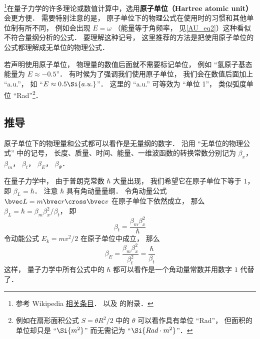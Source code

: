 

\footnote{参考 Wikipedia \href{https://en.wikipedia.org/wiki/Hartree_atomic_units}{相关条目}． 以及 \cite{Brandsen} 的附录．}在量子力学的许多理论或数值计算中，选用\textbf{原子单位（Hartree atomic unit）}会更方便． 需要特别注意的是， 原子单位下的物理公式在使用时的习惯和其他单位制有所不同， 例如会出现 $E = \omega$ （能量等于角频率， 见\autoref{AU_eq2}）这种看似不符合量纲分析的公式． 要理解这种记号， 这里推荐的方法是把使用原子单位的公式都理解成无单位的物理公式．

若声明使用原子单位， 物理量的数值后面就不需要标记单位， 例如 “氢原子基态能量为 $E \approx -0.5$”． 有时候为了强调我们使用原子单位， 我们会在数值后面加上 “a.u.”， 如 “$E \approx 0.5 \Si{a.u.}$”． 这里的 “a.u.” 可等效为 “单位 1”， 类似弧度单位 “Rad”\footnote{例如在扇形面积公式 $S = \theta R^2/2$ 中的 $\theta$ 可以看作具有单位 “Rad”， 但面积的单位却只是 “$\Si{m^2}$” 而无需记为 “$\Si{Rad\cdot m^2}$”．}．

\subsection{推导}
原子单位下的物理量和公式都可以看作是无量纲的数字． 沿用 “无单位的物理公式” 中的记号， 长度、质量、时间、能量、一维波函数的转换常数分别记为 $\beta_x$， $\beta_m$， $\beta_t$， $\beta_E$， $\beta_\Psi$．

在量子力学中， 由于普朗克常数 $\hbar$ 大量出现， 我们希望它在原子单位下等于 $1$， 即 $\beta_L = \hbar$． 注意 $\hbar$ 具有角动量量纲． 令角动量公式 $\bvec L = m \bvec r \cross \bvec v$ 在原子单位下依然成立， 那么 $\beta_L = \hbar = {\beta_m \beta_x^2}/{\beta_t}$， 即
\begin{equation}\label{AU_eq6}
\beta_t = \frac{\beta_m \beta_x^2}{\hbar}
\end{equation}
令动能公式 $E_k = mv^2/2$ 在原子单位中成立， 那么
\begin{equation}\label{AU_eq7}
\beta_E = \frac{\beta_m \beta_x^2}{\beta_t^2} = \frac{\hbar}{\beta_t}
\end{equation}
这样， 量子力学中所有公式中的 $\hbar$ 都可以看作是一个角动量常数并用数字 $1$ 代替了．

